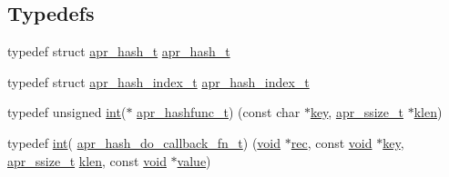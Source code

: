 \subsection*{Typedefs}
\begin{DoxyCompactItemize}
\item 
typedef struct \hyperlink{structapr__hash__t}{apr\+\_\+hash\+\_\+t} \hyperlink{group__apr__hash_ga72ec09b8bde6d874c36bd49df915fff6}{apr\+\_\+hash\+\_\+t}
\item 
typedef struct \hyperlink{structapr__hash__index__t}{apr\+\_\+hash\+\_\+index\+\_\+t} \hyperlink{group__apr__hash_ga3b3d353989f6cea4535630634be147f7}{apr\+\_\+hash\+\_\+index\+\_\+t}
\item 
typedef unsigned \hyperlink{pcre_8txt_a42dfa4ff673c82d8efe7144098fbc198}{int}($\ast$ \hyperlink{group__apr__hash_ga0bf5622266af13a2489c907a101cb156}{apr\+\_\+hashfunc\+\_\+t}) (const char $\ast$\hyperlink{apr__siphash_8h_adac0b6a30345ea1d0daa8a692b0b7ad9}{key}, \hyperlink{group__apr__platform_ga215ebb88932bee220b766263ebbfe6fa}{apr\+\_\+ssize\+\_\+t} $\ast$\hyperlink{apr__hash_8c_a2274d9ee336b1873447f6b5817beb856}{klen})
\item 
typedef \hyperlink{pcre_8txt_a42dfa4ff673c82d8efe7144098fbc198}{int}( \hyperlink{group__apr__hash_ga9352d7eed661ad06b7635314530a3227}{apr\+\_\+hash\+\_\+do\+\_\+callback\+\_\+fn\+\_\+t}) (\hyperlink{group__MOD__ISAPI_gacd6cdbf73df3d9eed42fa493d9b621a6}{void} $\ast$\hyperlink{group__apr__tables_gafcb9c0f7671f566c4804fa8bbad43c4b}{rec}, const \hyperlink{group__MOD__ISAPI_gacd6cdbf73df3d9eed42fa493d9b621a6}{void} $\ast$\hyperlink{apr__siphash_8h_adac0b6a30345ea1d0daa8a692b0b7ad9}{key}, \hyperlink{group__apr__platform_ga215ebb88932bee220b766263ebbfe6fa}{apr\+\_\+ssize\+\_\+t} \hyperlink{apr__hash_8c_a2274d9ee336b1873447f6b5817beb856}{klen}, const \hyperlink{group__MOD__ISAPI_gacd6cdbf73df3d9eed42fa493d9b621a6}{void} $\ast$\hyperlink{pcretest_8txt_a262ad32c75be9b93a7a77b045ed14fe0}{value})
\end{DoxyCompactItemize}
